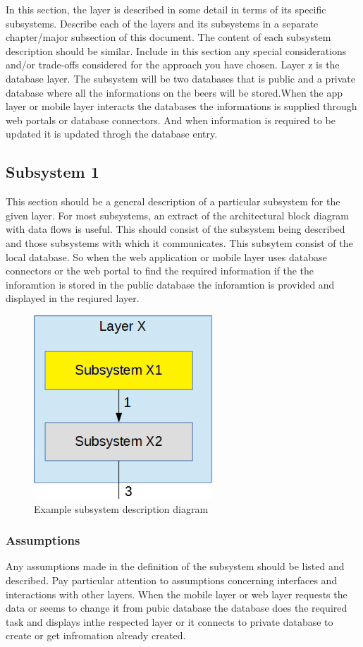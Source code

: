 In this section, the layer is described in some detail in terms of its specific subsystems. Describe each of the layers and its subsystems in a separate chapter/major subsection of this document. The content of each subsystem description should be similar. Include in this section any special considerations and/or trade-offs considered for the approach you have chosen.
Layer z is the database layer. The subsystem will be two databases that is public and a private database where all the informations on the beers will be stored.When the app layer or mobile layer interacts the databases the informations is supplied through web portals or database connectors. And when information is required to be updated it is updated throgh the database entry.
\subsection{Subsystem 1}
This section should be a general description of a particular subsystem for the given layer. For most subsystems, an extract of the architectural block diagram with data flows is useful. This should consist of the subsystem being described and those subsystems with which it communicates.
This subsytem consist of the local database. So when the web application or mobile layer uses database connectors or the web portal to find the required information if the the inforamtion is stored in the public database the inforamtion is provided and displayed in the reqiured layer.
\begin{figure}[h!]
	\centering
 	\includegraphics[width=0.60\textwidth]{images/subsystem}
 \caption{Example subsystem description diagram}
\end{figure}

\subsubsection{Assumptions}
Any assumptions made in the definition of the subsystem should be listed and described. Pay particular attention to assumptions concerning interfaces and interactions with other layers.
When the mobile layer or web layer requests the data or seems to change it from pubic database the database does the required task and displays inthe respected layer or it connects to private database to create or get infromation already created.

